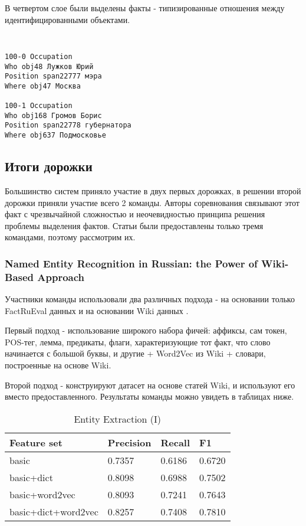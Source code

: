 В четвертом слое были выделены факты - типизированные отношения между идентифицированными объектами.

{\tt \small
\begin{verbatim}
100-0 Occupation
Who obj48 Лужков Юрий
Position span22777 мэра
Where obj47 Москва

100-1 Occupation
Who obj168 Громов Борис
Position span22778 губернатора
Where obj637 Подмосковье
\end{verbatim}
}

\subsection{Итоги дорожки}

Большинство систем приняло участие в двух первых дорожках, в решении второй дорожки приняли участие всего 2 команды. Авторы соревнования связывают этот факт с чрезвычайной сложностью и неочевидностью принципа решения проблемы выделения фактов. Статьи были предоставлены только тремя командами, поэтому рассмотрим их.

\subsubsection{Named Entity Recognition in Russian: the Power of Wiki-Based Approach}

Участники команды использовали два различных подхода - на основании только FactRuEval данных и на основании Wiki данных \cite{NOTHMAN2013151}. 

Первый подход - использование широкого набора фичей: аффиксы, сам токен, POS-тег, лемма, предикаты, флаги, характеризующие тот факт, что слово начинается с большой буквы, и другие + Word2Vec из Wiki + словари, построенные на основе Wiki. 

Второй подход - конструируют датасет на основе статей Wiki, и используют его вместо предоставленного. Результаты команды можно увидеть в таблицах ниже.

\begin{table}[ht]
\centering
\caption{Entity Extraction (I)}
\label{factrueval_1_1}
\begin{tabular}{|l|l|l|l|}
\hline
Feature set               & Precision & Recall & F1     \\ \hline
basic                     & 0.7357    & 0.6186 & 0.6720 \\ \hline
basic+dict                & 0.8098    & 0.6988 & 0.7502 \\ \hline
basic+word2vec            & 0.8093    & 0.7241 & 0.7643 \\ \hline
basic+dict+word2vec       & 0.8257    & 0.7408 & 0.7810 \\ \hline
\end{tabular}
\end{table}



